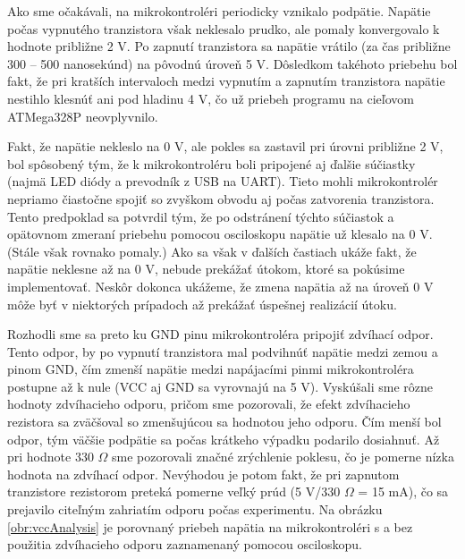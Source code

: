 Ako sme očakávali, na mikrokontroléri periodicky vznikalo podpätie. Napätie počas vypnutého tranzistora však neklesalo prudko, ale pomaly konvergovalo k hodnote približne 2 V. Po zapnutí tranzistora sa napätie vrátilo (za čas približne 300 -- 500 nanosekúnd) na pôvodnú úroveň 5 V. Dôsledkom takéhoto priebehu bol fakt, že pri kratších intervaloch medzi vypnutím a zapnutím tranzistora napätie nestihlo klesnúť ani pod hladinu 4 V, čo už priebeh programu na cieľovom ATMega328P neovplyvnilo.

Fakt, že napätie nekleslo na 0 V, ale pokles sa zastavil pri úrovni približne 2 V, bol spôsobený tým, že k mikrokontroléru boli pripojené aj ďalšie súčiastky (najmä LED diódy a prevodník z USB na UART). Tieto mohli mikrokontrolér nepriamo čiastočne spojiť so zvyškom obvodu aj počas zatvorenia tranzistora. Tento predpoklad sa potvrdil tým, že po odstránení týchto súčiastok a opätovnom zmeraní priebehu pomocou osciloskopu napätie už klesalo na 0 V. (Stále však rovnako pomaly.) Ako sa však v ďalších častiach ukáže fakt, že napätie neklesne až na 0 V, nebude prekážať útokom, ktoré sa pokúsime implementovať. Neskôr dokonca ukážeme, že zmena napätia až na úroveň 0 V môže byť v niektorých prípadoch až prekážať úspešnej realizácií útoku.

Rozhodli sme sa preto ku GND pinu mikrokontroléra pripojiť zdvíhací odpor. Tento odpor, by po vypnutí tranzistora mal podvihnúť napätie medzi zemou a pinom GND, čím zmenší napätie medzi napájacími pinmi mikrokontroléra postupne až k nule (VCC aj GND sa vyrovnajú na 5 V). Vyskúšali sme rôzne hodnoty zdvíhacieho odporu, pričom sme pozorovali, že efekt zdvíhacieho rezistora sa zväčšoval so zmenšujúcou sa hodnotou jeho odporu. Čím menší bol odpor, tým väčšie podpätie sa počas krátkeho výpadku podarilo dosiahnuť. Až pri hodnote 330 $\Omega$ sme pozorovali značné zrýchlenie poklesu, čo je pomerne nízka hodnota na zdvíhací odpor. Nevýhodou je potom fakt, že pri zapnutom tranzistore rezistorom preteká pomerne veľký prúd (5 V/330 $\Omega$ = 15 mA), čo sa prejavilo citeľným zahriatím odporu počas experimentu. Na obrázku \ref{obr:vccAnalysis} je porovnaný priebeh napätia na mikrokontroléri s a bez použitia zdvíhacieho odporu zaznamenaný pomocou osciloskopu.

